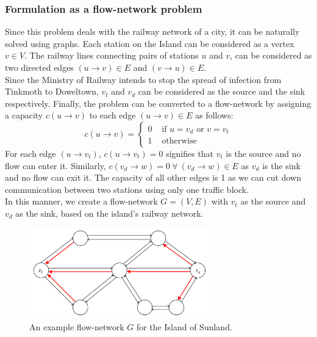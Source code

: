 \documentclass[12pt]{report}
\begin{document}
    \subsubsection*{Formulation as a flow-network problem}
    Since this problem deals with the railway network of a city, it can be naturally solved using graphs.
    Each station on the Island can be considered as a vertex $v \in V$.
    The railway lines connecting pairs of stations $u$ and $v$, can be considered as two directed edges $(u \to v) \in E$ and $(v \to u) \in E$. \\
    Since the Ministry of Railway intends to stop the spread of infection from Tinkmoth to Doweltown, $v_{t}$ and $v_{d}$
    can be considered as the source and the sink respectively.
    Finally, the problem can be converted to a flow-network by assigning a capacity $c(u \to v)$ to each edge $(u \to v) \in E$ as follows:
    \begin{equation}
        \label{eq:capacity}
        c(u \to v) = \begin{cases}
            0 & \text{ if $u = v_{d}$ or $v = v_{t}$} \\
            1 & \text{ otherwise}
        \end{cases}
    \end{equation}
    For each edge $(u \to v_{t})$, $c(u \to v_{t}) = 0$ signifies that $v_{t}$ is the source and no flow can enter it.
    Similarly, $c(v_{d} \to w) = 0 \ \forall \ (v_{d} \to w) \in E$ as $v_{d}$ is the sink and no flow can exit it.
    The capacity of all other edges is 1 as we can cut down communication between two stations using only one traffic block. \\
    In this manner, we create a flow-network $G = (V, E)$ with $v_{t}$ as the source and $v_{d}$ as the sink, based on the island's railway network. \hfill
    \begin{figure}[htp]
        \begin{center}
            \includegraphics[width=0.7\textwidth]{network.png}
        \end{center}
        \caption{An example flow-network $G$ for the Island of Sunland.}
        \label{fig:network}
    \end{figure}
\end{document}
